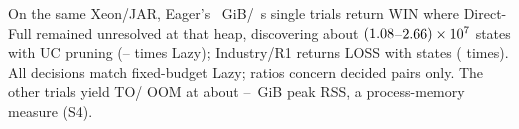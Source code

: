 \noindent On the same Xeon/JAR, Eager's \VThreeExtSevenHeap{}~GiB/\VThreeExtSevenCap{}~s single trials return \VThreeExtSevenWin{} WIN where Direct-Full remained unresolved at that heap, discovering about $(1.08{}$--$2.66{})\times10^7$ states with UC pruning (\VThreeExtSevenWinRatioMinApprox{}--\VThreeExtSevenWinRatioMaxApprox{} times Lazy); Industry/R1 returns LOSS with \VThreeExtSevenIndustryROneStates{} states (\VThreeExtSevenIndustryROneRatio{} times).
All \VThreeExtSevenAgree{} decisions match fixed-budget Lazy; ratios concern decided pairs only.
The other \VThreeExtSevenUnresolved{} trials yield \VThreeExtSevenTO{} TO/\VThreeExtSevenOOM{} OOM at about \VThreeExtSevenFailureRSSMinWhole{}--\VThreeExtSevenFailureRSSMaxWhole{}~GiB peak RSS, a process-memory measure (S4).
